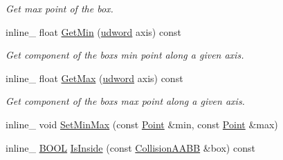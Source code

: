 \begin{DoxyCompactItemize}
\begin{DoxyCompactList}\small\item\em Get max point of the box. \end{DoxyCompactList}\item 
inline\+\_\+ float \hyperlink{classCollisionAABB_a5d0562b18a2f9c1b6650497418151d2b}{Get\+Min} (\hyperlink{IceTypes_8h_a44c6f1920ba5551225fb534f9d1a1733}{udword} axis) const \hypertarget{classCollisionAABB_a5d0562b18a2f9c1b6650497418151d2b}{}\label{classCollisionAABB_a5d0562b18a2f9c1b6650497418151d2b}

\begin{DoxyCompactList}\small\item\em Get component of the box\textquotesingle{}s min point along a given axis. \end{DoxyCompactList}\item 
inline\+\_\+ float \hyperlink{classCollisionAABB_a04092d9c71ac7959bdd7e8864759ada2}{Get\+Max} (\hyperlink{IceTypes_8h_a44c6f1920ba5551225fb534f9d1a1733}{udword} axis) const \hypertarget{classCollisionAABB_a04092d9c71ac7959bdd7e8864759ada2}{}\label{classCollisionAABB_a04092d9c71ac7959bdd7e8864759ada2}

\begin{DoxyCompactList}\small\item\em Get component of the box\textquotesingle{}s max point along a given axis. \end{DoxyCompactList}\item 
inline\+\_\+ void \hyperlink{classCollisionAABB_a77f7c00377db42bc0988a9b882bad296}{Set\+Min\+Max} (const \hyperlink{classPoint}{Point} \&min, const \hyperlink{classPoint}{Point} \&max)
\item 
inline\+\_\+ \hyperlink{IceTypes_8h_a050c65e107f0c828f856a231f4b4e788}{B\+O\+OL} \hyperlink{classCollisionAABB_a108349eb75dbdebc7444b35e3e40aa46}{Is\+Inside} (const \hyperlink{classCollisionAABB}{Collision\+A\+A\+BB} \&box) const 
\end{DoxyCompactItemize}
